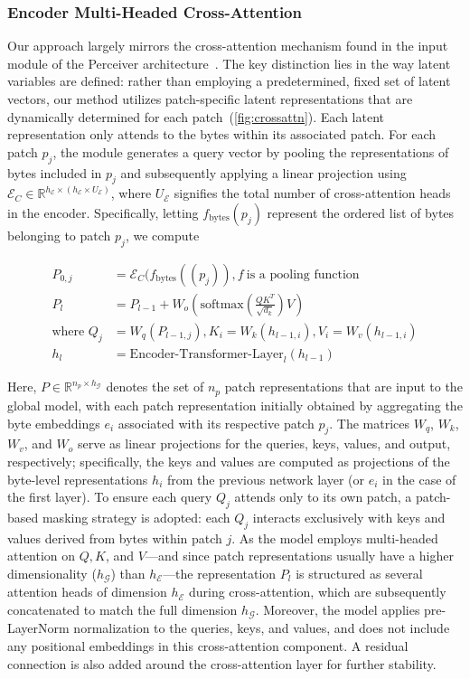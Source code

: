 \subsubsection{Encoder Multi-Headed Cross-Attention}
\label{sec:enc-cross-attn}
Our approach largely mirrors the cross-attention mechanism found in the input module of the Perceiver architecture~\citep{jaegle2021perceiver}. The key distinction lies in the way latent variables are defined: rather than employing a predetermined, fixed set of latent vectors, our method utilizes patch-specific latent representations that are dynamically determined for each patch~(\autoref{fig:crossattn}). Each latent representation only attends to the bytes within its associated patch. For each patch $p_j$, the module generates a query vector by pooling the representations of bytes included in $p_j$ and subsequently applying a linear projection using $\mathcal{E}_{C} \in \mathbb{R}^{h_{\mathcal{E}} \times (h_{\mathcal{E}} \times U_{\mathcal{E}})}$, where $U_{\mathcal{E}}$ signifies the total number of cross-attention heads in the encoder. Specifically, letting $f_{\text{bytes}}(p_j)$ represent the ordered list of bytes belonging to patch $p_j$, we compute

\begin{align}
P_{0,j} &= \mathcal{E}_{C}(f_\text{bytes}((p_j)), f~ \text{is a pooling function} \\
P_l &= P_{l-1} + W_o\left(\text{softmax}\left(\frac{QK^T}{\sqrt{d_k}}\right)V\right) \\
\text{where } Q_j &= W_q(P_{l-1,j}), K_i = W_k(h_{l-1,i}), V_i = W_v(h_{l-1,i}) \\
h_l &= \text{Encoder-Transformer-Layer}_l(h_{l-1})
\end{align}

Here, $P \in \mathbb{R}^{n_p \times h_{\mathcal{G}}}$ denotes the set of $n_p$ patch representations that are input to the global model, with each patch representation initially obtained by aggregating the byte embeddings $e_i$ associated with its respective patch $p_j$. The matrices $W_q$, $W_k$, $W_v$, and $W_o$ serve as linear projections for the queries, keys, values, and output, respectively; specifically, the keys and values are computed as projections of the byte-level representations $h_i$ from the previous network layer (or $e_i$ in the case of the first layer). To ensure each query $Q_j$ attends only to its own patch, a patch-based masking strategy is adopted: each $Q_j$ interacts exclusively with keys and values derived from bytes within patch $j$. As the model employs multi-headed attention on $Q, K$, and $V$—and since patch representations usually have a higher dimensionality ($h_{\mathcal{G}}$) than $h_{\mathcal{E}}$—the representation $P_l$ is structured as several attention heads of dimension $h_{\mathcal{E}}$ during cross-attention, which are subsequently concatenated to match the full dimension $h_{\mathcal{G}}$. Moreover, the model applies pre-LayerNorm normalization to the queries, keys, and values, and does not include any positional embeddings in this cross-attention component. A residual connection is also added around the cross-attention layer for further stability.

